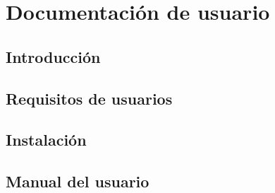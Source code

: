 \chapter{Documentación de usuario} %
\label{cha:Documentación de usuario}

\section{Introducción}

\section{Requisitos de usuarios}

\section{Instalación}

\section{Manual del usuario}

